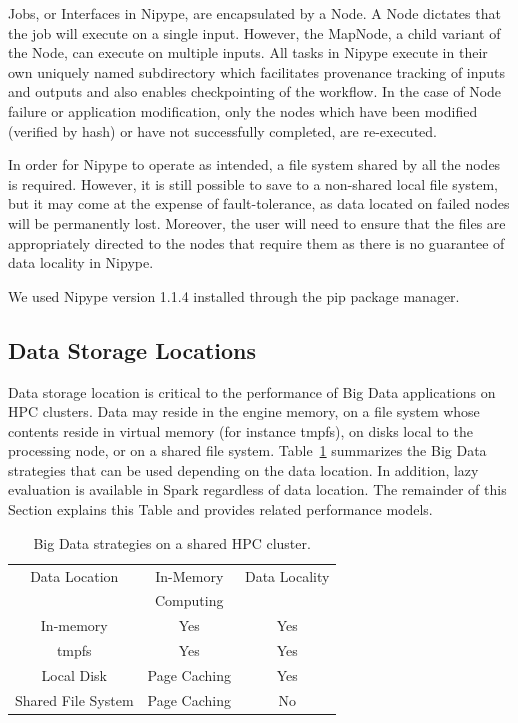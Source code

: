 Jobs, or Interfaces in Nipype, are encapsulated by a Node. A Node dictates that
the job will execute on a single input. However, the MapNode, a child variant of
the Node, can execute on multiple inputs. All tasks in Nipype execute in their
own uniquely named subdirectory which facilitates provenance tracking of inputs
and outputs and also enables checkpointing of the workflow. In the case of Node
failure or application modification, only the nodes which have been modified
(verified by hash) or have not successfully completed, are re-executed.

In order for Nipype to operate as intended, a file system shared by all the nodes
is required. However, it is still possible to save to a non-shared local
file system, but it may come at the expense of fault-tolerance, as data located
on failed nodes will be permanently lost. Moreover, the user will need to ensure
that the files are appropriately directed to the nodes that require them as
there is no guarantee of data locality in Nipype.

We used Nipype version 1.1.4 installed through the pip package manager.

\subsection{Data Storage Locations}

Data storage location is critical to the performance of Big Data applications on
HPC clusters. Data may reside in the engine memory, on a file system whose
contents reside in virtual memory (for instance tmpfs), on disks local to the
processing node, or on a shared file system. Table~\ref{table:inmem:features}
summarizes the Big Data strategies that can be used depending on the data
location. In addition, lazy evaluation is available in Spark regardless of data
location. The remainder of this Section explains this Table and provides related
performance models.

\begin{table}
\centering
\begin{tabular}{c|cc}
   \rowcolor{headcolor}
    Data Location                 & In-Memory     & Data Locality        \\
    \rowcolor{headcolor}
                                  & Computing     &                     \\
                                  \hline          
In-memory                         & \cellcolor{green!25} Yes           &
\cellcolor{green!25}Yes                      \\
tmpfs                             & \cellcolor{green!25} Yes           &
\cellcolor{green!25}Yes                  \\
Local Disk                        & \cellcolor{orange!25}Page Caching  &
\cellcolor{green!25}Yes                  \\
Shared File System                & \cellcolor{orange!25}Page Caching  &
\cellcolor{red!25}No                
\end{tabular}
\setlength{\belowcaptionskip}{-10pt}
\caption{Big Data strategies on a shared HPC cluster.}
\label{table:inmem:features}
\end{table}

